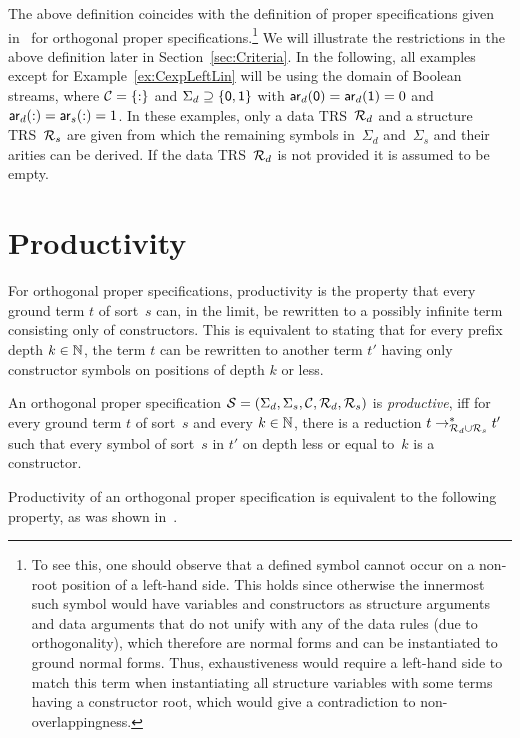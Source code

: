 \documentclass{eptcs}
\begin{document}
The above definition coincides with the definition of proper specifications
given in~\cite{ZR10} for orthogonal proper specifications.\footnote{To see this, one should observe that a defined symbol cannot occur on a non-root
position of a left-hand side. This holds since otherwise the innermost such
symbol would have variables and constructors as structure arguments and data
arguments that do not unify with any of the data rules (due to orthogonality),
which therefore are normal forms and can be instantiated to ground normal forms.
Thus, exhaustiveness would require a left-hand side to match this term when
instantiating all structure variables with some terms having a constructor root,
which would give a contradiction to non-overlappingness.}
We will illustrate the restrictions in the above definition later in
Section~\ref{sec:Criteria}.
In the following, all examples except for Example~\ref{ex:CexpLeftLin}
will be using the domain of Boolean streams,
where $\mathcal{C} = \{ {:} \}$ and $\Sigma_d \supseteq \{ \mathsf{0},\mathsf{1} \}$ with
$\mathsf{ar}_d(\mathsf{0}) = \mathsf{ar}_d(\mathsf{1}) = 0$ and $\mathsf{ar}_d(:) = \mathsf{ar}_s(:) = 1$.
In these examples, only a data TRS~$\mathcal{R}_d$ and a structure TRS~$\mathcal{R}_s$ are given
from which the remaining symbols in~$\Sigma_d$ and~$\Sigma_s$ and their arities
can be derived.
If the data TRS~$\mathcal{R}_d$ is not provided it is assumed to be empty.


\section{Productivity}
\label{sec:Productivity}

For orthogonal proper specifications, productivity is the property that
every ground term $t$ of sort~$s$ can, in the limit, be rewritten to a possibly
infinite term consisting only of constructors. This is equivalent to stating
that for every prefix depth $k \in \mathbb{N}$, the term $t$ can be rewritten to
another term $t'$ having only constructor symbols on positions of depth $k$ or
less.

\begin{definition}
\label{def:OrthoProd}
An orthogonal proper specification $\mathcal{S} = (\Sigma_d,\Sigma_s,\mathcal{C},\mathcal{R}_d,\mathcal{R}_s)$ is
\emph{productive},
iff for every ground term $t$ of sort~$s$ and every $k \in \mathbb{N}$,
there is a reduction $t \to_{\mathcal{R}_d \cup \mathcal{R}_s}^* t'$ such that every
symbol of sort~$s$ in $t'$ on depth less or equal to~$k$ is a constructor.
\end{definition}

Productivity of an orthogonal proper specification is equivalent to the
following property, as was shown in~\cite{ZR10}.
\end{document}
